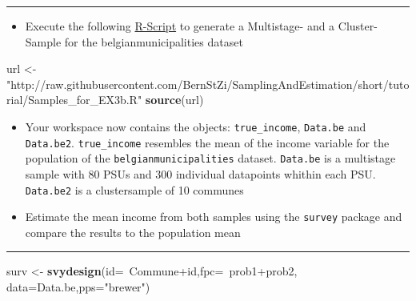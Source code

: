 \documentclass[]{article}
\newenvironment{Shaded}{\begin{snugshade}}{\end{snugshade}}
\newcommand{\KeywordTok}[1]{\textcolor[rgb]{0.13,0.29,0.53}{\textbf{{#1}}}}
\newcommand{\DataTypeTok}[1]{\textcolor[rgb]{0.13,0.29,0.53}{{#1}}}
\newcommand{\StringTok}[1]{\textcolor[rgb]{0.31,0.60,0.02}{{#1}}}
\newcommand{\NormalTok}[1]{{#1}}
\begin{document}
\begin{center}\rule{0.5\linewidth}{\linethickness}\end{center}

\begin{itemize}
\itemsep1pt\parskip0pt
\item
  Execute the following
  \href{https://raw.githubusercontent.com/BernStZi/SamplingAndEstimation/short/tutorial/Samples_for_EX3b.R}{R-Script}
  to generate a Multistage- and a Cluster- Sample for the
  belgianmunicipalities dataset
\end{itemize}

\begin{Shaded}
\begin{Highlighting}[]
\NormalTok{url <-}\StringTok{ "http://raw.githubusercontent.com/BernStZi/SamplingAndEstimation/short/tutorial/Samples_for_EX3b.R"}
\KeywordTok{source}\NormalTok{(url)}
\end{Highlighting}
\end{Shaded}

\begin{itemize}
\itemsep1pt\parskip0pt
\item
  Your workspace now contains the objects: \texttt{true\_income},
  \texttt{Data.be} and \texttt{Data.be2}. \texttt{true\_income}
  resembles the mean of the income variable for the population of the
  \texttt{belgianmunicipalities} dataset. \texttt{Data.be} is a
  multistage sample with 80 PSUs and 300 individual datapoints whithin
  each PSU. \texttt{Data.be2} is a clustersample of 10 communes
\item
  Estimate the mean income from both samples using the \texttt{survey}
  package and compare the results to the population mean
\end{itemize}

\begin{center}\rule{0.5\linewidth}{\linethickness}\end{center}

\begin{Shaded}
\begin{Highlighting}[]
\NormalTok{surv <-}\StringTok{ }\KeywordTok{svydesign}\NormalTok{(}\DataTypeTok{id=}\NormalTok{~Commune+id,}\DataTypeTok{fpc=}\NormalTok{~prob1+prob2, }
                  \DataTypeTok{data=}\NormalTok{Data.be,}\DataTypeTok{pps=}\StringTok{"brewer"}\NormalTok{)}
\end{Highlighting}
\end{Shaded}
\end{document}
